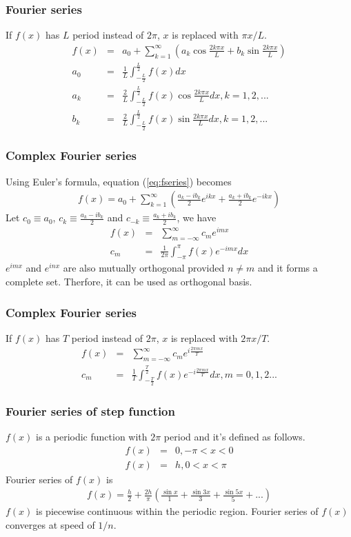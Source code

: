 \documentclass{beamer}
\begin{document}
\begin{frame}
\frametitle{Fourier series}
If $f(x)$ has $L$ period instead of $2\pi$, $x$ is replaced with $\pi x /L$.
\begin{eqnarray}
f(x)&=&a_0 + \sum_{k=1}^{\infty} \left(a_k\cos \frac{2k\pi x}{L} + b_k \sin \frac{2k\pi x}{L}\right) \nonumber \\
a_0&=&\frac{1}{L}\int_{-\frac{L}{2}}^{\frac{L}{2}}f(x) dx \nonumber \\
a_k&=&\frac{2}{L}\int_{-\frac{L}{2}}^{\frac{L}{2}}f(x) \cos \frac{2k\pi x}{L} dx, k = 1,2,...\nonumber \\
b_k&=&\frac{2}{L}\int_{-\frac{L}{2}}^{\frac{L}{2}}f(x) \sin \frac{2k\pi x}{L} dx, k = 1,2,...
\label{eq:fseries_pL}
\end{eqnarray}
\end{frame}
\begin{frame}
\frametitle{Complex Fourier series}
Using Euler's formula, equation (\ref{eq:fseries}) becomes 
\begin{eqnarray}
f(x)=a_0 + \sum_{k=1}^{\infty} \left(\frac{a_k - ib_k}{2} e^{ikx} + \frac{a_k + ib_k}{2}e^{-ikx}\right) \nonumber
\end{eqnarray}
Let $c_0 \equiv a_0$, $c_k \equiv \frac{a_k - ib_k}{2}$ and $c_{-k} \equiv \frac{a_k + ib_k}{2}$, we have
\begin{eqnarray}
f(x)&=&\sum_{m=-\infty}^{\infty} c_m e^{imx} \nonumber \\
c_m&=&\frac{1}{2\pi}\int_{-\pi}^{\pi} f(x) e^{-imx} dx
\label{eq:cfseries}
\end{eqnarray}
$e^{imx}$ and $e^{inx}$ are also mutually orthogonal provided $n \neq m$ and it forms a complete set. Therfore, it can be used as orthogonal basis.\newline
\end{frame}
\begin{frame}
\frametitle{Complex Fourier series}
If $f(x)$ has $T$ period instead of $2\pi$, $x$ is replaced with $2\pi x /T$.
\begin{eqnarray}
f(x)&=&\sum_{m=-\infty}^{\infty} c_m e^{i\frac{2\pi mx}{T}} \nonumber \\
c_m&=&\frac{1}{T}\int_{-\frac{T}{2}}^{\frac{T}{2}} f(x) e^{-i\frac{2\pi mx}{T}} dx, m = 0,1,2...
\label{eq:cfseries_pT}
\end{eqnarray}
\end{frame}
\begin{frame}
\frametitle{Fourier series of step function}
$f(x)$ is a periodic function with $2\pi$ period and it's defined as follows.
\begin{eqnarray}
f(x)&=& 0, -\pi < x < 0 \nonumber \\
f(x)&=& h, 0 < x < \pi
\label{eq:stepfunc}
\end{eqnarray}
Fourier series of $f(x)$ is
\begin{eqnarray}
f(x)= \frac{h}{2} + \frac{2h}{\pi} \left( \frac{\sin x}{1} + \frac{\sin 3x}{3} + \frac{\sin 5x}{5} + ...\right)
\label{eq:stepfunc_ft}
\end{eqnarray}
$f(x)$ is piecewise continuous within the periodic region. Fourier series of $f(x)$ converges at speed of $1/n$.
\end{frame}
\end{document}
